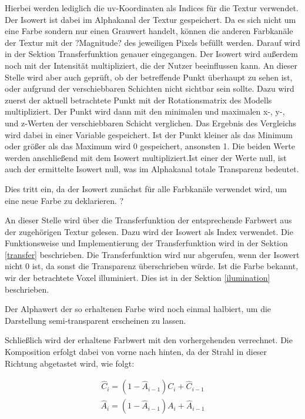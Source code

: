 Hierbei werden lediglich die uv-Koordinaten als Indices für die Textur verwendet. 
Der Isowert ist dabei im Alphakanal der Textur gespeichert. Da es sich nicht um eine Farbe sondern nur einen Grauwert handelt, können die anderen Farbkanäle der Textur mit der ?Magnitude? des jeweiligen Pixels befüllt werden. Darauf wird in der Sektion Transferfunktion genauer eingegangen.
Der Isowert wird außerdem noch mit der Intensität multipliziert, die der Nutzer beeinflussen kann.
An dieser Stelle wird aber auch geprüft, ob der betreffende Punkt überhaupt zu sehen ist, oder aufgrund der verschiebbaren Schichten nicht sichtbar sein sollte. 
Dazu wird zuerst der aktuell betrachtete Punkt mit der Rotationsmatrix des Modells multipliziert.
Der Punkt wird dann mit den minimalen und maximalen x-, y-, und z-Werten der verschiebbaren Schicht verglichen. Das Ergebnis des Vergleichs wird dabei in einer Variable gespeichert. Ist der Punkt kleiner als das Minimum oder größer als das Maximum wird 0 gespeichert, ansonsten 1. 
Die beiden Werte werden anschließend mit dem Isowert multipliziert.Ist einer der Werte null, ist auch der ermittelte Isowert null, was im Alphakanal totale Transparenz bedeutet. 


Dies tritt ein, da der Isowert zunächst für alle Farbkanäle verwendet wird, um eine neue Farbe zu deklarieren. ?

An dieser Stelle wird über die Transferfunktion der entsprechende Farbwert aus der zugehörigen Textur gelesen. Dazu wird der Isowert als Index verwendet. Die Funktionsweise und Implementierung der Transferfunktion wird in der Sektion \ref{transfer} beschrieben.
Die Transferfunktion wird nur abgerufen, wenn der Isowert nicht 0 ist, da sonst die Transparenz überschrieben würde.
Ist die Farbe bekannt, wir der betrachtete Voxel illuminiert. Dies ist in der Sektion \ref{ilumination} beschrieben. 

Der Alphawert der so erhaltenen Farbe wird noch einmal halbiert, um die Darstellung semi-transparent erscheinen zu lassen.

Schließlich wird der erhaltene Farbwert mit den vorhergehenden verrechnet. Die Komposition erfolgt dabei von vorne nach hinten, da der Strahl in dieser Richtung abgetastet wird, wie folgt:

\begin{align}
\hat{C}_{i}=(1-\hat{A}_{i-1})C_{i}+\hat{C}_{i-1}
\end{align}
\begin{align}
\hat{A}_{i}=(1-\hat{A}_{i-1})A_{i}+\hat{A}_{i-1}
\end{align}

